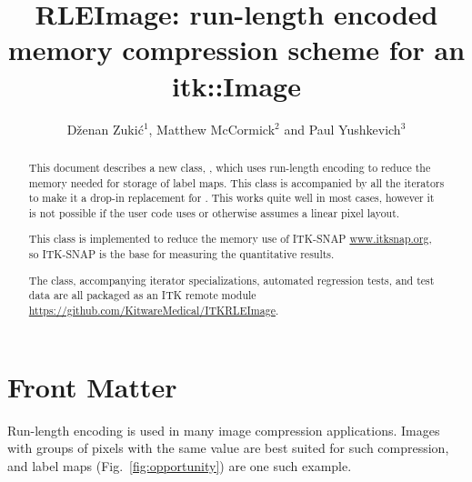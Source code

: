\documentclass{InsightArticle}
\title{RLEImage: run-length encoded memory compression scheme for an itk::Image}
\author{D{\v z}enan Zuki{\' c}$^{1}$, Matthew McCormick$^{2}$ and Paul Yushkevich$^{3}$}
\newcommand{\IJhandlerIDnumber}{1338}
\begin{document}
\IJhandlefooter{\IJhandlerIDnumber}

\ifpdf
\else
\fi

\maketitle

\ifhtml
\chapter*{Front Matter\label{front}}
\fi


\begin{abstract}
\noindent
This document describes a new class, ,
which uses run-length encoding to reduce the memory needed for storage of label maps.
This class is accompanied by all the iterators
to make it a drop-in replacement for .
This works quite well in most cases, however it is not possible if the user code
uses  or otherwise assumes a linear pixel layout.

This class is implemented to reduce the memory use of ITK-SNAP \url{www.itksnap.org},
so ITK-SNAP is the base for measuring the quantitative results.

The class, accompanying iterator specializations, automated regression tests, and test data
are all packaged as an ITK remote module \url{https://github.com/KitwareMedical/ITKRLEImage}.
\end{abstract}

\IJhandlenote{\IJhandlerIDnumber}

\tableofcontents


Run-length encoding is used in many image compression applications\cite{wikiRLE}.
Images with groups of pixels with the same value are best suited for such compression,
and label maps (Fig.~\ref{fig:opportunity}) are one such example.
\end{document}
